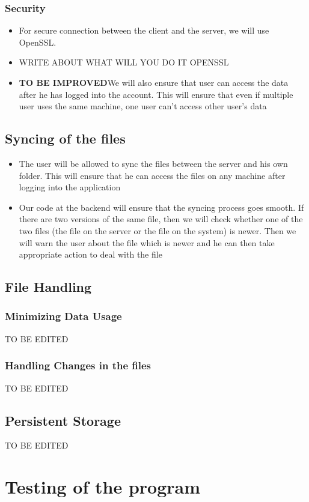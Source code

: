 \documentclass{article}
\begin{document}
\subsubsection{Security}
\begin{itemize}
\item For secure connection between the client and the server, we will use OpenSSL.
\item WRITE ABOUT WHAT WILL YOU DO IT OPENSSL
\item \textbf{TO BE IMPROVED}We will also ensure that user can access the data after he has logged into the account. This will ensure that even if multiple user uses the same machine, one user can't access other user's data
\end{itemize}
\subsection{Syncing of the files}
\begin{itemize}
\item The user will be allowed to sync the files between the server and his own folder. This will ensure that he can access the files on any machine after logging into the application
\item Our code at the backend will ensure that the syncing process goes smooth. If there are two versions of the same file, then we will check whether one of the two files (the file on the server or the file on the system) is newer. Then we will warn the user about the file which is newer and he can then take appropriate action to deal with the file
\end{itemize}
\subsection{File Handling}
\subsubsection{Minimizing Data Usage}
TO BE EDITED
\subsubsection{Handling Changes in the files}
TO BE EDITED
\subsection{Persistent Storage}
TO BE EDITED
\section{Testing of the program}
\end{document}
